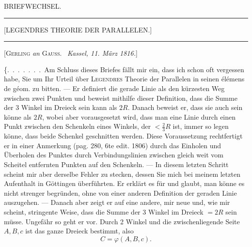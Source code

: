 \clearpage
{}\centerline{\Large BRIEFWECHSEL.}

\bigskip
\hrule
\bigskip

\centerline{[LEGENDRES THEORIE DER PARALLELEN.]}

\bigskip
\hrule
\bigskip

\centerline{[\textsc{Gerling} \emph{an} \textsc{Gauss}. \ \emph{Kassel, 11. März 1816.}]}

\smallskip

\{.\ .\ .\ .\ .\ .\ .\ Am Schluss dieses Briefes fällt mir ein, dass ich schon oft vergessen habe, Sie um Ihr Urteil über \textsc{Legendres} Theorie der Parallelen in seinen élémens de géom. zu bitten. --- Er definiert die gerade Linie als den kürzesten Weg zwischen zwei Punkten und beweist mithilfe dieser Definition, dass die Summe der 3 Winkel im Dreieck  sein kann als $2R$. Danach beweist er, dass sie auch  sein könne als $2R$, wobei aber vorausgesetzt wird, dass man eine Linie durch einen Punkt zwischen den Schenkeln eines Winkels, der $< \tfrac{2}{3}R$ ist, immer so legen könne, dass beide Schenkel geschnitten werden. Diese Voraussetzung rechtfertigt er in einer Anmerkung (pag. 280, 6te edit. 1806) durch das Einholen und Überholen des Punktes durch Verbindungslinien zwischen gleich weit vom Scheitel entfernten Punkten auf den Schenkeln. --- In diesem letzten Schritt scheint mir aber derselbe
Fehler zu stecken, dessen Sie mich bei meinem letzten Aufenthalt in Göttingen überführten. Er erklärt es für  und glaubt, man könne es nicht strenger begründen, ohne von einer anderen Definition der geraden Linie auszugehen. --- Danach aber zeigt er auf eine andere, mir neue und, wie mir scheint, stringente Weise, dass die Summe der 3 Winkel im Dreieck $= 2R$ sein müsse. Ungefähr so geht er vor. Durch 2 Winkel und die zwischenliegende Seite $A, B, c$ ist das ganze Dreieck bestimmt, also
\[
C = \varphi(A,B,c).
\]
